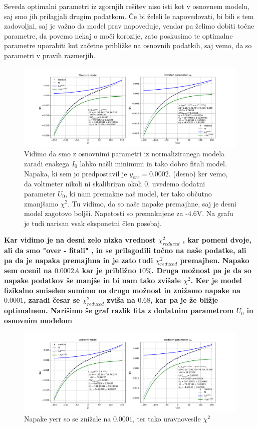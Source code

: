 \documentclass[11pt, a4paper]{article}
\begin{document}
 Seveda optimalni parametri iz zgornjih rešitev niso isti kot v osnovnem modelu, saj smo jih prilagjali drugim podatkom. Če bi želeli le napovedovati, bi bili s tem zadovoljni, saj je važno da model prav napoveduje, vendar pa želimo dobiti točne parametre, da povemo nekaj o moči korozije, zato poskusimo te optimalne parametre uporabiti kot začetne približke na osnovnih podatkih, saj vemo, da so parametri v pravih razmerjih.
 \begin{figure}[H]
\hspace*{-3.5 cm}     
  \includegraphics[width=24cm] {tretja_pravi_fit.pdf}
 \caption{Vidimo da smo z osnovnimi parametri iz normaliziranega modela zaradi enakega $I_0$ lahko našli minimum in tako dobro fitali model. Napaka, ki sem jo predpostavil je $y_{err} = 0.0002$. (desno) ker vemo, da voltmeter nikoli ni skalibriran okoli 0, uvedemo dodatni parameter $U_0$, ki nam premakne naš model, ter tako občutno zmanjšamo $\chi^2$. Tu vidimo, da so naše napake premajhne, saj je desni model zagotovo boljši. Napetosti so premaknjene za -4.6V. Na grafu je tudi narisan vsak eksponetni člen posebaj.}
 \end{figure}
 \textbf{ Kar vidimo je na desni zelo nizka vrednost $\chi^2_{reduced}$ , kar pomeni dvoje, ali da smo "over - fitali" , in se prilagodili točno na naše podatke, ali pa da je napaka premajhna in je zato tudi $\chi^2_{reduced}$  premajhen. Napako sem ocenil na  $0.0002 A$ kar je približno $10\%$. Druga možnost pa je da so napake podatkov še manjše in bi nam tako zvišale $\chi^2$. Ker je model fizikalno smiselen sumimo na drugo možnost in znižamo napake na $0.0001$, zaradi česar se $\chi^2_{reduced}$ zviša na $0.68$, kar pa je že bližje optimalnem.\newline\newline
 Narišimo še graf razlik fita z dodatnim parametrom $U_0$ in osnovnim modelom}
  \begin{figure}[H]
\hspace*{-3.5 cm}     
  \includegraphics[width=24cm] {tretja_pravi_fit_zvisanje_chi.png}
 \caption{Napake yerr so se znižale na $0.0001$, ter tako uravnovesile $\chi^2$}
 \end{figure}
 
\end{document}
